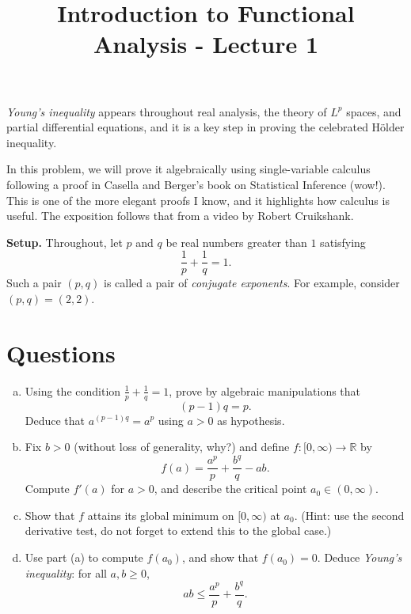 \documentclass[12pt]{article}
\title{Introduction to Functional Analysis - Lecture 1}
\author{}
\date{}
\begin{document}
\maketitle

\textit{Young's inequality} appears throughout real analysis, the theory of $L^p$ spaces,
and partial differential equations, and it is a key step in proving the celebrated H\"{o}lder inequality.

In this problem, we will prove it algebraically using single-variable calculus following a proof in Casella and Berger's book on Statistical Inference (wow!). This is one of the more elegant proofs I know, and it highlights how calculus is useful. The exposition follows that from a video by Robert Cruikshank.

\medskip\noindent
\textbf{Setup.}
Throughout, let $p$ and $q$ be real numbers greater than $1$ satisfying
\[
  \frac{1}{p}+\frac{1}{q}=1.
\]
Such a pair $(p,q)$ is called a pair of \textit{conjugate exponents}. For example, consider $(p,q)=(2,2)$.

\section*{Questions}

\begin{enumerate}[(a)]


\item Using the condition $\frac{1}{p}+\frac{1}{q}=1$, prove by algebraic manipulations that
\[
  (p-1)q = p.
\]
Deduce that $a^{(p-1)q} = a^p$ using $a > 0$ as hypothesis.

\item Fix $b>0$ (without loss of generality, why?) and define $f\colon[0,\infty)\to\mathbb{R}$ by
\[
  f(a) = \frac{a^p}{p}+\frac{b^q}{q}-ab.
\]
Compute $f'(a)$ for $a>0$, and describe the critical point $a_0\in(0,\infty)$.

\item Show that $f$ attains its global minimum on $[0,\infty)$ at $a_0$. (Hint: use the second derivative test, do not forget to extend this to the global case.)

\item Use part (a) to compute $f(a_0)$, and show that $f(a_0)=0$.
      Deduce \textit{Young's inequality}: for all $a,b\geq 0$,
      \[
        ab \leq \frac{a^p}{p}+\frac{b^q}{q}.
      \]
\end{enumerate}
\end{document}
